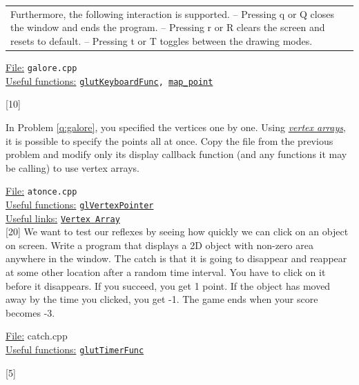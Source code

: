 \documentclass[addpoints]{exam}
\begin{document}
\begin{questions}
\begin{tabularx}{\linewidth}{lX}
    Furthermore, the following interaction is supported.\newline
    -- Pressing q or Q closes the window and ends the program.\newline
    -- Pressing r or R clears the screen and resets to default.\newline
    -- Pressing t or T toggles between the drawing modes.
  \end{tabularx}
  \underline{File:} {\tt galore.cpp}\\
  \underline{Useful functions:} {\tt \href{https://www.opengl.org/resources/libraries/glut/spec3/node49.html#SECTION00084000000000000000}{glutKeyboardFunc}, \hyperref[q:galore]{map\_point}}

  [10]

  In Problem \ref{q:galore}, you specified the vertices one by one. Using \href{http://www.informit.com/articles/article.aspx?p=1377833&seqNum=6}{\it vertex arrays}, it is possible to specify the points all at once. Copy the file from the previous problem and modify only its display callback function (and any functions it may be calling) to use vertex arrays.
  
  \noindent\underline{File:} {\tt atonce.cpp}\\
  \underline{Useful functions:} {\tt \href{https://www.khronos.org/registry/OpenGL-Refpages/gl2.1/xhtml/glVertexPointer.xml}{glVertexPointer}}\\
  \underline{Useful links:} {\tt \href{http://www.songho.ca/opengl/gl_vertexarray.html}{Vertex Array}}\\
  
  [20]
  We want to test our reflexes by seeing how quickly we can click on an object on screen. Write a program that displays a 2D object with non-zero area anywhere in the window. The catch is that it is going to disappear and reappear at some other location after a random time interval. You have to click on it before it disappears. If you succeed, you get 1 point. If the object has moved away by the time you clicked, you get -1. The game ends when your score becomes -3.

  \noindent\underline{File:} {catch.cpp}\\
  \underline{Useful functions:} {\tt \href{https://www.opengl.org/resources/libraries/glut/spec3/node64.html#SECTION000819000000000000000}{glutTimerFunc}}

  [5]


\end{questions}
\end{document}
